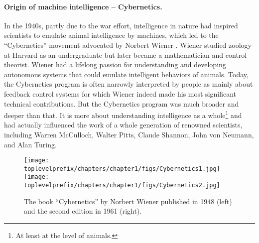 \documentclass[../../book-main.tex]{subfiles}
\begin{document}
\paragraph{Origin of machine intelligence -- Cybernetics.}
In the 1940s, partly due to the war effort, intelligence in nature had inspired scientists to emulate animal intelligence by machines, which led to the ``Cybernetics'' movement advocated by Norbert Wiener \cite{Kline-2011}. Wiener studied zoology at Harvard as an undergraduate but later became a mathematician and control theorist. Wiener had a lifelong passion for understanding and developing autonomous systems that could emulate intelligent behaviors of animals. Today, the Cybernetics program is often narrowly interpreted by people as mainly about feedback control systems for which Wiener indeed made his most significant technical contributions. But the Cybernetics program was much broader and deeper than that. It is more about understanding intelligence as a whole\footnote{At least at the level of animals.} and had actually influenced the work of a whole generation of renowned scientists, including Warren McCulloch, Walter Pitts, Claude Shannon, John von Neumann, and Alan Turing.  

\begin{figure}
    \centering
    \texttt{[image: \\toplevelprefix/chapters/chapter1/figs/Cybernetics1.jpg]}
    \hspace{10mm} \texttt{[image: \\toplevelprefix/chapters/chapter1/figs/Cybernetics2.jpg]}
    \caption{The book ``Cybernetics'' by Norbert Wiener published in 1948 \cite{Wiener-Cybernetics-1948} (left) and the second edition in 1961 \cite{Wiener-Cybernetics-1961} (right).}
    \label{fig:cybernetcis}
\end{figure}
\end{document}
